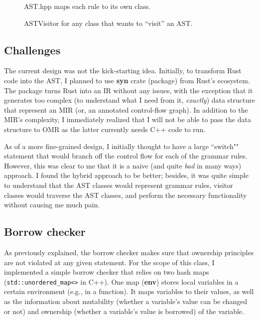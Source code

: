 \begin{figure*}[ht]
    \begin{center}
        
    \end{center}
    \caption{AST.hpp maps each rule to its own class.}
    \label{cpp1}
\end{figure*}

\begin{figure*}[ht]
    \begin{center}
        
    \end{center}
    \caption{ASTVisitor for any class that wants to ``visit'' an AST.}
    \label{cpp2}
\end{figure*}

\subsection{Challenges}

The current design was not the kick-starting idea. Initially, to transform Rust
code into the AST, I planned to use \textbf{syn} crate (package) from Rust's
ecosystem.  The package turns Rust into an IR without any issues, with the
exception that it generates too complex (to understand what I need from it,
\textit{exactly}) data structure that represent an MIR (or, an annotated
control-flow graph). In addition to the MIR's complexity, I immediately
realized that I will not be able to pass the data structure
to OMR as the latter currently needs C++ code to run.

As of a more fine-grained design, I initially thought to
have a large ``switch"" statement that would branch off
the control flow for each of the grammar rules. However,
this was clear to me that it is a naive (and quite \textit{bad} in many ways)
approach. I found the hybrid approach to be better; besides,
it was quite simple to understand that the AST classes would
represent grammar rules, visitor classes would traverse the AST
classes, and perform the necessary functionality without causing me much
pain.

\subsection{Borrow checker}

As previously explained, the borrow checker makes sure that
ownership principles are not violated at any given statement.
For the scope of this class, I implemented a simple borrow checker
that relies on two hash maps (\texttt{std::unordered\_map<>} in C++).
One map (\textbf{env}) stores local variables in a certain environment
(e.g., in a function). It maps variables to their values, as well as
the information about mutability (whether a variable's
value can be changed or not) and ownership (whether a variable's value is
borrowed) of the variable.

